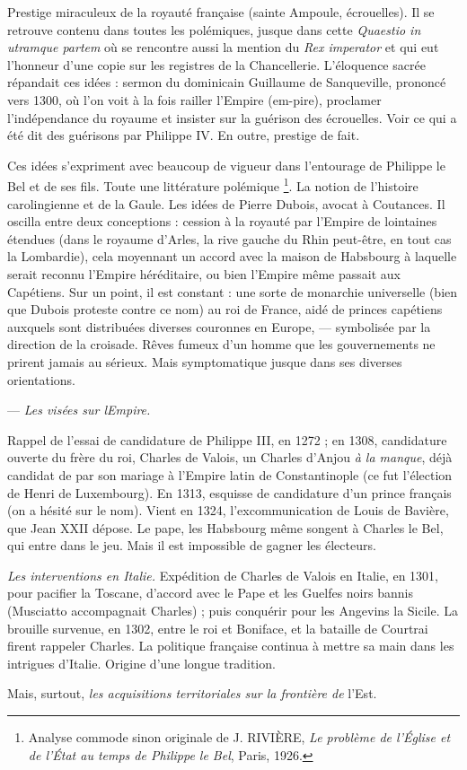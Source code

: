\documentclass[french,twoside]{book} %
\begin{document}
Prestige miraculeux de la royauté française (sainte Ampoule, écrouelles). Il se retrouve contenu dans toutes les polémiques, jusque dans cette {\itshape Quaestio in utramque partem} où se rencontre aussi la mention du {\itshape Rex imperator} et qui eut l’honneur d’une copie sur les registres de la Chancellerie. L’éloquence sacrée répandait ces idées : sermon du dominicain Guillaume de Sanqueville, prononcé vers 1300, où l’on voit à la fois railler l’Empire (em-pire), proclamer l’indépendance du royaume et insister sur la guérison des écrouelles. Voir ce qui a été dit des guérisons par Philippe IV. En outre, prestige de fait.\par
Ces idées s’expriment avec beaucoup de vigueur dans l’entourage de Philippe le Bel et de ses fils. Toute une littérature polémique \footnote{ Analyse commode sinon originale de J. RIVIÈRE, {\itshape Le problème de l’Église et de l’État au temps de Philippe le Bel}, Paris, 1926.}. La notion de l’histoire carolingienne et de la Gaule. Les idées de Pierre Dubois, avocat à Coutances. Il oscilla entre deux conceptions : cession à la royauté par l’Empire de lointaines étendues (dans le  
\label{p33} royaume d’Arles, la rive gauche du Rhin peut-être, en tout cas la Lombardie), cela moyennant un accord avec la maison de Habsbourg à laquelle serait reconnu l’Empire héréditaire, ou bien l’Empire même passait aux Capétiens. Sur un point, il est constant : une sorte de monarchie universelle (bien que Dubois proteste contre ce nom) au roi de France, aidé de princes capétiens auxquels sont distribuées diverses couronnes en Europe, — symbolisée par la direction de la croisade. Rêves fumeux d’un homme que les gouvernements ne prirent jamais au sérieux. Mais symptomatique jusque dans ses diverses orientations.\par
— {\itshape Les visées sur lEmpire.}\par
Rappel de l’essai de candidature de Philippe III, en 1272 ; en 1308, candidature ouverte du frère du roi, Charles de Valois, un Charles d’Anjou \emph{à la manque}, déjà candidat de par son mariage à l’Empire latin de Constantinople (ce fut l’élection de Henri de Luxembourg). En 1313, esquisse de candidature d’un prince français (on a hésité sur le nom). Vient en 1324, l’excommunication de Louis de Bavière, que Jean XXII dépose. Le pape, les Habsbourg même songent à Charles le Bel, qui entre dans le jeu. Mais il est impossible de gagner les électeurs.\par
{\itshape Les interventions en Italie.} Expédition de Charles de Valois en Italie, en 1301, pour pacifier la Toscane, d’accord avec le Pape et les Guelfes noirs bannis (Musciatto accompagnait Charles) ; puis conquérir pour les Angevins la Sicile. La brouille survenue, en 1302, entre le roi et Boniface, et la bataille de Courtrai firent rappeler Charles. La politique française continua à mettre sa main dans les intrigues d’Italie. Origine d’une longue tradition.\par
Mais, surtout, {\itshape les acquisitions territoriales sur la frontière de} l’Est.\par
\end{document}
